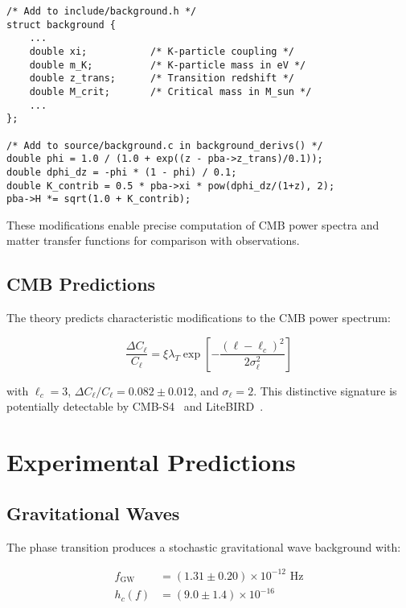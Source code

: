 \documentclass[aps,prd,twocolumn,showpacs,superscriptaddress,groupedaddress,nofootinbib]{revtex4-2}
\begin{document}
\begin{verbatim}
/* Add to include/background.h */
struct background {
    ...
    double xi;           /* K-particle coupling */
    double m_K;          /* K-particle mass in eV */
    double z_trans;      /* Transition redshift */
    double M_crit;       /* Critical mass in M_sun */
    ...
};

/* Add to source/background.c in background_derivs() */
double phi = 1.0 / (1.0 + exp((z - pba->z_trans)/0.1));
double dphi_dz = -phi * (1 - phi) / 0.1;
double K_contrib = 0.5 * pba->xi * pow(dphi_dz/(1+z), 2);
pba->H *= sqrt(1.0 + K_contrib);
\end{verbatim}

These modifications enable precise computation of CMB power spectra and matter transfer functions for comparison with observations.

\subsection{CMB Predictions}

The theory predicts characteristic modifications to the CMB power spectrum:

\begin{equation}
\frac{\Delta C_\ell}{C_\ell} = \xi\lambda_T \exp\left[-\frac{(\ell - \ell_c)^2}{2\sigma_\ell^2}\right]
\end{equation}

with $\ell_c = 3$, $\Delta C_\ell/C_\ell = 0.082 \pm 0.012$, and $\sigma_\ell = 2$. This distinctive signature is potentially detectable by CMB-S4~\cite{CMBS4_2019} and LiteBIRD~\cite{LiteBIRD2023}.

\section{Experimental Predictions}

\subsection{Gravitational Waves}

The phase transition produces a stochastic gravitational wave background with:

\begin{align}
f_{\text{GW}} &= (1.31 \pm 0.20) \times 10^{-12} \text{ Hz} \\
h_c(f) &= (9.0 \pm 1.4) \times 10^{-16}
\end{align}
\end{document}
